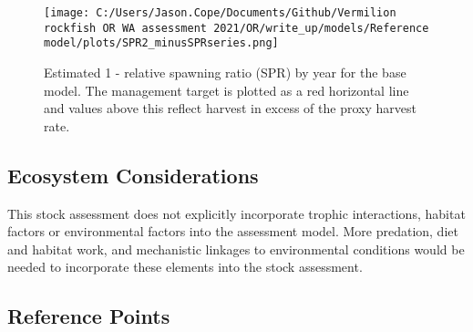 \documentclass[11pt,
  english,
  a4paper,
]{article}
\begin{document}
\leavevmode\tagmcend\tagstructend\par




\begin{figure}
\centering
\texttt{[image: C:/Users/Jason.Cope/Documents/Github/Vermilion rockfish OR WA assessment 2021/OR/write\_up/models/Reference model/plots/SPR2\_minusSPRseries.png]}
\caption{Estimated 1 - relative spawning ratio (SPR) by year for the base model. The management target is plotted as a red horizontal line and values above this reflect harvest in excess of the proxy harvest rate.\label{fig:es-1-spr}}
\end{figure}

\tagmcend\tagstructend

\clearpage


\hypertarget{ecosystem-considerations}{%
\subsection*{Ecosystem Considerations}\label{ecosystem-considerations}}

\leavevmode\tagmcend\tagstructend


This stock assessment does not explicitly incorporate trophic interactions, habitat factors or environmental factors into the assessment model. More predation, diet and habitat work, and mechanistic linkages to environmental conditions would be needed to incorporate these elements into the stock assessment.

\leavevmode\tagmcend\tagstructend\par


\hypertarget{reference-points}{%
\subsection*{Reference Points}\label{reference-points}}
\end{document}
